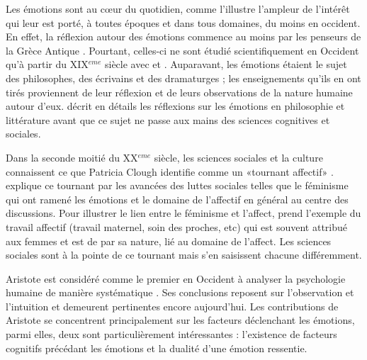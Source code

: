 \documentclass[a4paper,12pt]{report}
\begin{document}
Les émotions sont au cœur du quotidien, comme l'illustre l'ampleur de l'intérêt qui leur est porté, à toutes époques et dans tous domaines, du moins en occident. En effet, la réflexion autour des émotions commence au moins par les penseurs de la Grèce Antique \parencite{plamper15}. Pourtant, celles-ci ne sont étudié scientifiquement en Occident qu'à partir du XIX$^{eme}$ siècle avec \textcite{darwin1872} et \textcites{james1884, james1894} \parencite{marcus2000}. Auparavant, les émotions étaient le sujet des philosophes, des écrivains et des dramaturges ; les enseignements qu'ils en ont tirés proviennent de leur réflexion et de leurs observations de la nature humaine autour d'eux.  \textcite{elster98} décrit en détails les réflexions sur les émotions en philosophie et littérature avant que ce sujet ne passe aux mains des sciences cognitives et sociales. \par 

Dans la seconde moitié du XX$^{eme}$ siècle, les sciences sociales et la culture connaissent ce que Patricia Clough identifie comme un «\;tournant affectif\;» \parencite{clough07}. \textcite{hardt07} explique ce tournant par les avancées des luttes sociales telles que le féminisme qui ont ramené les émotions et le domaine de l'affectif en général au centre des discussions. Pour illustrer le lien entre le féminisme et l'affect, \textcite{hardt07} prend l'exemple du travail affectif (travail maternel, soin des proches, etc) qui est souvent attribué aux femmes et est de par sa nature, lié au domaine de l'affect. Les sciences sociales sont à la pointe de ce tournant mais s'en saisissent chacune différemment. \par 

Aristote est considéré comme le premier en Occident à analyser la psychologie humaine de manière systématique \parencite{kennedy91}. Ses conclusions reposent sur l'observation et l'intuition et demeurent pertinentes encore aujourd'hui. Les contributions de Aristote se concentrent principalement sur les facteurs déclenchant les émotions, parmi elles, deux sont particulièrement intéressantes : l'existence de facteurs cognitifs précédant les émotions et la dualité d'une émotion ressentie. \par 
\end{document}
